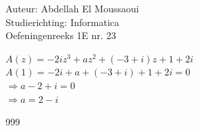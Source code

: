 \documentclass[a4paper]{article}
\begin{document}
  
\noindent \large Auteur: Abdellah El Moussaoui \\
\noindent \large Studierichting: Informatica\\
\noindent \large Oefeningenreeks 1E nr. 23\\

\medskip

\normalsize

\medskip

$A(z)=-2iz^3+az^2+(-3+i)z+1+2i$\\

$A(1)=-2i+a+(-3+i)+1+2i=0$\\

$\Rightarrow a-2+i=0$\\

$ \Rightarrow \boxed {a=2-i}$\\

\begin{thebibliography}{999}
\end{thebibliography}
\end{document}
